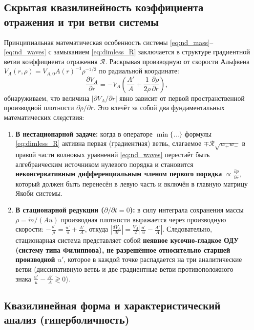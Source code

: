 \documentclass[11pt,a4paper]{article}
\begin{document}
\subsection{Скрытая квазилинейность коэффициента отражения и три ветви системы}

Принципиальная математическая особенность системы \eqref{eq:nd_mass}--\eqref{eq:nd_waves} с замыканием \eqref{eq:dimless_R} заключается в структуре градиентной ветви коэффициента отражения $\mathcal{R}$. Раскрывая производную от скорости Альфвена $V_A(r, \rho) = V_{A,0} A(r)^{-1}\rho^{-1/2}$ по радиальной координате:
\begin{equation}
\frac{\partial V_A}{\partial r} = -V_A\left(\frac{A'}{A} + \frac{1}{2\rho}\frac{\partial\rho}{\partial r}\right),
\label{eq:dVA_dr}
\end{equation}
обнаруживаем, что величина $|\partial V_A/\partial r|$ явно зависит от первой пространственной производной плотности $\partial\rho/\partial r$. Это влечёт за собой два фундаментальных математических следствия:
\begin{enumerate}
\item \textbf{В нестационарной задаче:} когда в операторе $\min\{\dots\}$ формулы \eqref{eq:dimless_R} активна первая (градиентная) ветвь, слагаемое $\mp\mathcal{R}\sqrt{w_+ w_-}$ в правой части волновых уравнений \eqref{eq:nd_waves} перестаёт быть алгебраическим источником нулевого порядка и становится \textbf{неконсервативным дифференциальным членом первого порядка} $\propto \frac{\partial\rho}{\partial r}$, который должен быть перенесён в левую часть и включён в главную матрицу Якоби системы.
\item \textbf{В стационарной редукции ($\partial/\partial t = 0$):} в силу интеграла сохранения массы $\rho = \dot{m}/(Au)$ производная плотности выражается через производную скорости: $-\frac{\rho'}{\rho} = \frac{u'}{u} + \frac{A'}{A}$, откуда $|\frac{dV_A}{dr}| = \frac{V_A}{2}\left|\frac{u'}{u} - \frac{A'}{A}\right|$. Следовательно, стационарная система представляет собой \textbf{неявное кусочно-гладкое ОДУ (систему типа Филиппова), не разрешённое относительно старшей производной $u'$}, которое в каждой точке распадается на три аналитические ветви (диссипативную ветвь и две градиентные ветви противоположного знака $\frac{u'}{u} - \frac{A'}{A} \gtrless 0$).
\end{enumerate}

\subsection{Квазилинейная форма и характеристический анализ (гиперболичность)}
\end{document}
